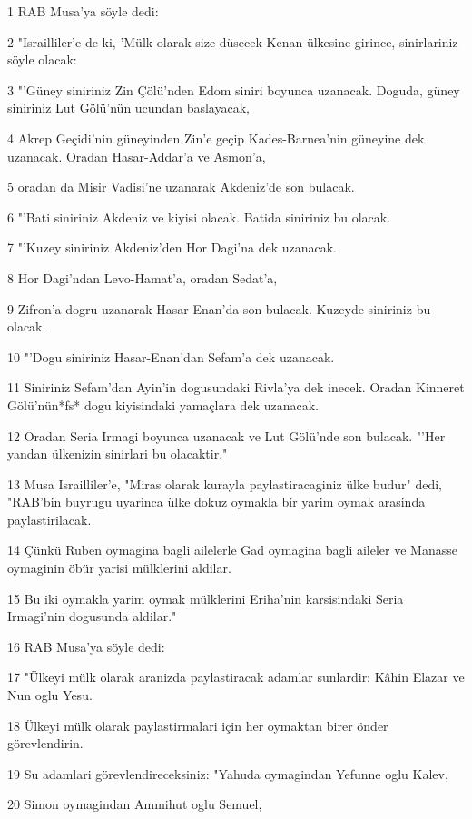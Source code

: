 \par 1 RAB Musa'ya söyle dedi:
\par 2 "Israilliler'e de ki, 'Mülk olarak size düsecek Kenan ülkesine girince, sinirlariniz söyle olacak:
\par 3 "'Güney siniriniz Zin Çölü'nden Edom siniri boyunca uzanacak. Doguda, güney siniriniz Lut Gölü'nün ucundan baslayacak,
\par 4 Akrep Geçidi'nin güneyinden Zin'e geçip Kades-Barnea'nin güneyine dek uzanacak. Oradan Hasar-Addar'a ve Asmon'a,
\par 5 oradan da Misir Vadisi'ne uzanarak Akdeniz'de son bulacak.
\par 6 "'Bati siniriniz Akdeniz ve kiyisi olacak. Batida siniriniz bu olacak.
\par 7 "'Kuzey siniriniz Akdeniz'den Hor Dagi'na dek uzanacak.
\par 8 Hor Dagi'ndan Levo-Hamat'a, oradan Sedat'a,
\par 9 Zifron'a dogru uzanarak Hasar-Enan'da son bulacak. Kuzeyde siniriniz bu olacak.
\par 10 "'Dogu siniriniz Hasar-Enan'dan Sefam'a dek uzanacak.
\par 11 Siniriniz Sefam'dan Ayin'in dogusundaki Rivla'ya dek inecek. Oradan Kinneret Gölü'nün*fs* dogu kiyisindaki yamaçlara dek uzanacak.
\par 12 Oradan Seria Irmagi boyunca uzanacak ve Lut Gölü'nde son bulacak. "'Her yandan ülkenizin sinirlari bu olacaktir."
\par 13 Musa Israilliler'e, "Miras olarak kurayla paylastiracaginiz ülke budur" dedi, "RAB'bin buyrugu uyarinca ülke dokuz oymakla bir yarim oymak arasinda paylastirilacak.
\par 14 Çünkü Ruben oymagina bagli ailelerle Gad oymagina bagli aileler ve Manasse oymaginin öbür yarisi mülklerini aldilar.
\par 15 Bu iki oymakla yarim oymak mülklerini Eriha'nin karsisindaki Seria Irmagi'nin dogusunda aldilar."
\par 16 RAB Musa'ya söyle dedi:
\par 17 "Ülkeyi mülk olarak aranizda paylastiracak adamlar sunlardir: Kâhin Elazar ve Nun oglu Yesu.
\par 18 Ülkeyi mülk olarak paylastirmalari için her oymaktan birer önder görevlendirin.
\par 19 Su adamlari görevlendireceksiniz: "Yahuda oymagindan Yefunne oglu Kalev,
\par 20 Simon oymagindan Ammihut oglu Semuel,
